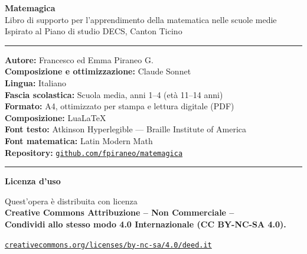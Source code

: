 
\cleardoublepage
\thispagestyle{empty}

\vspace*{\fill}

{\small
    \begin{center}
        {\large\bfseries\color{blu} Matemagica}\\[4pt]
        {\normalsize Libro di supporto per l'apprendimento della matematica nelle scuole medie}\\[2pt]
        {\normalsize Ispirato al Piano di studio DECS, Canton Ticino}
    \end{center}

    \medskip
    \noindent\rule{\linewidth}{0.4pt}
    \medskip

    \noindent\textbf{Autore:} Francesco ed Emma Piraneo G.\\
    \textbf{Composizione e ottimizzazione:} Claude Sonnet\\
    \textbf{Lingua:} Italiano\\
    \textbf{Fascia scolastica:} Scuola media, anni 1–4 (età 11–14 anni)\\
    \textbf{Formato:} A4, ottimizzato per stampa e lettura digitale (PDF)\\
    \textbf{Composizione:} LuaLaTeX\\
    \textbf{Font testo:} Atkinson Hyperlegible — Braille Institute of America\\
    \textbf{Font matematica:} Latin Modern Math\\
    \textbf{Repository:} \href{https://github.com/fpiraneo/matemagica}{\texttt{github.com/fpiraneo/matemagica}}

    \medskip
    \noindent\rule{\linewidth}{0.4pt}
    \medskip

    \noindent\textbf{Licenza d'uso}

    \smallskip
    \noindent Quest'opera è distribuita con licenza\\
    \textbf{Creative Commons Attribuzione – Non Commerciale –}\\
    \textbf{Condividi allo stesso modo 4.0 Internazionale (CC BY-NC-SA 4.0).}

    \smallskip
    \noindent\href{https://creativecommons.org/licenses/by-nc-sa/4.0/deed.it}%
    {\texttt{creativecommons.org/licenses/by-nc-sa/4.0/deed.it}}

}
